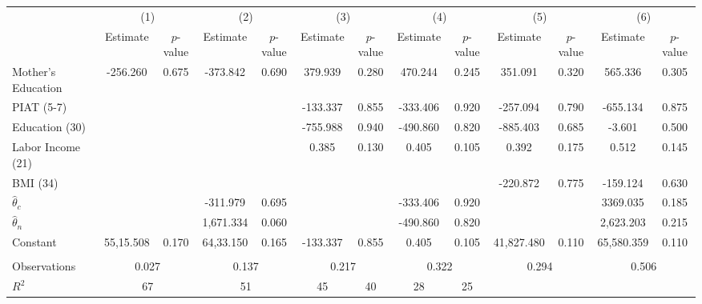 \begin{tabular}{lcccccccccccc} \toprule
 & \multicolumn{2}{c}{(1)}  &  \multicolumn{2}{c}{(2)}  &  \multicolumn{2}{c}{(3)}  &  \multicolumn{2}{c}{(4)}  & \multicolumn{2}{c}{(5)} & \multicolumn{2}{c}{(6)} \\  
 & Estimate & $p$-value & Estimate & $p$-value & Estimate & $p$-value & Estimate & $p$-value & Estimate & $p$-value & Estimate & $p$-value \\ \midrule
Mother's Education &  -256.260 &     0.675 &  -373.842 &     0.690 &   379.939 &     0.280 &   470.244 &     0.245 &   351.091 &     0.320 &   565.336 &     0.305 \\  
PIAT (5-7) &         &         &         &         &  -133.337 &     0.855 &  -333.406 &     0.920 &  -257.094 &     0.790 &  -655.134 &     0.875 \\  
Education (30) &         &         &         &         &  -755.988 &     0.940 &  -490.860 &     0.820 &  -885.403 &     0.685 &    -3.601 &     0.500 \\  
Labor Income (21) &         &         &         &         &     0.385 &     0.130 &     0.405 &     0.105 &     0.392 &     0.175 &     0.512 &     0.145 \\  
BMI (34) &         &         &         &         &         &         &         &         &  -220.872 &     0.775 &  -159.124 &     0.630 \\  
$\hat{\theta}_{c}$ &         &         &  -311.979 &     0.695 &         &         &  -333.406 &     0.920 &         &         &  3369.035 &     0.185 \\  
$\hat{\theta}_{n}$  &         &         &  1,671.334 &     0.060 &         &         &  -490.860 &     0.820 &         &         &  2,623.203 &     0.215 \\  
Constant &  55,15.508 &     0.170 &  64,33.150 &     0.165 &  -133.337 &     0.855 &     0.405 &     0.105 & 41,827.480 &     0.110 & 65,580.359 &     0.110 \\  \\ \midrule
Observations &     \multicolumn{2}{c}{0.027}  &     \multicolumn{2}{c}{0.137}  &     \multicolumn{2}{c}{0.217} &     \multicolumn{2}{c}{0.322}  &     \multicolumn{2}{c}{0.294}  &     \multicolumn{2}{c}{0.506}  \\  
$R^2$ &    \multicolumn{2}{c}{67}  &    \multicolumn{2}{c}{51}  &    45  &    40 &    28  &    25  \\  
\bottomrule \end{tabular}